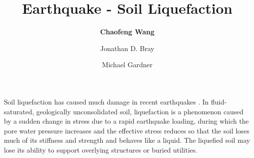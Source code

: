 %
%
%


%
%
%
%
%
%
%
%

\title{Earthquake - Soil Liquefaction}
\author{
    \textbf{Chaofeng Wang} 
    \and Jonathan D. Bray
    \and Michael Gardner}
\tocauthor{}
%
%
\maketitle

Soil liquefaction has caused much damage in recent earthquakes \citep[e.g.][]{cubrinovski2011geotechnical,cubrinovski2017liquefaction,bray2017new}. In fluid-saturated, geologically unconsolidated soil, liquefaction is a phenomenon caused by a sudden change in stress due to a rapid earthquake loading, during which the pore water pressure increases and the effective stress reduces so that the soil loses much of its stiffness and strength and behaves like a liquid. The liquefied soil may lose its ability to support overlying structures or buried utilities. 

